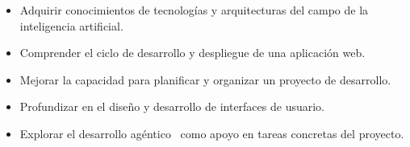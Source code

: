 \begin{itemize}
    \item Adquirir conocimientos de tecnologías y arquitecturas
    del campo de la inteligencia artificial.

    \item Comprender el ciclo de desarrollo y despliegue de una
    aplicación web.

    \item Mejorar la capacidad para planificar y organizar un
    proyecto de desarrollo.

    \item Profundizar en el diseño y desarrollo de interfaces de usuario.

    \item Explorar el desarrollo agéntico~\cite{ibm_agentic_coding}
    como apoyo en tareas concretas del proyecto.
\end{itemize}
